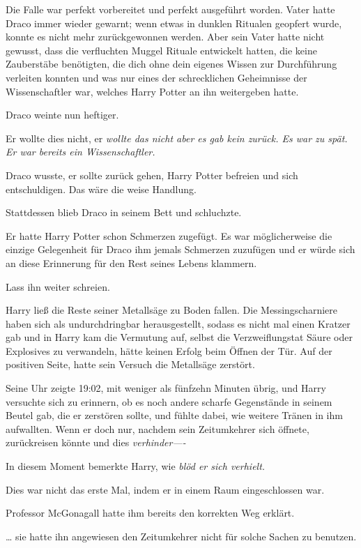 {Die Falle war perfekt vorbereitet und perfekt ausgeführt worden. Vater hatte Draco immer wieder gewarnt; wenn etwas in dunklen Ritualen geopfert wurde, konnte es nicht mehr zurückgewonnen werden. Aber sein Vater hatte nicht gewusst, dass die verfluchten Muggel Rituale entwickelt hatten, die keine Zauberstäbe benötigten, die dich ohne dein eigenes Wissen zur Durchführung verleiten konnten und was nur eines der schrecklichen Geheimnisse der Wissenschaftler war, welches Harry Potter an ihn weitergeben hatte.

Draco weinte nun heftiger.

Er wollte dies nicht, er \emph{wollte das nicht aber es gab kein zurück. Es war zu spät. Er war bereits ein Wissenschaftler.}

Draco wusste, er sollte zurück gehen, Harry Potter befreien und sich entschuldigen. Das wäre die weise Handlung.

Stattdessen blieb Draco in seinem Bett und schluchzte.

Er hatte Harry Potter schon Schmerzen zugefügt. Es war möglicherweise die einzige Gelegenheit für Draco ihm jemals Schmerzen zuzufügen und er würde sich an diese Erinnerung für den Rest seines Lebens klammern.

Lass ihn weiter schreien.

Harry ließ die Reste seiner Metallsäge zu Boden fallen. Die Messingscharniere haben sich als undurchdringbar herausgestellt, sodass es nicht mal einen Kratzer gab und in Harry kam die Vermutung auf, selbst die Verzweiflungstat Säure oder Explosives zu verwandeln, hätte keinen Erfolg beim Öffnen der Tür. Auf der positiven Seite, hatte sein Versuch die Metallsäge zerstört.

Seine Uhr zeigte 19:02, mit weniger als fünfzehn Minuten übrig, und Harry versuchte sich zu erinnern, ob es noch andere scharfe Gegenstände in seinem Beutel gab, die er zerstören sollte, und fühlte dabei, wie weitere Tränen in ihm aufwallten. Wenn er doch nur, nachdem sein Zeitumkehrer sich öffnete, zurückreisen könnte und dies \emph{verhinder----}

In diesem Moment bemerkte Harry, wie \emph{blöd er sich verhielt.}

Dies war nicht das erste Mal, indem er in einem Raum eingeschlossen war.

Professor McGonagall hatte ihm bereits den korrekten Weg erklärt.

… sie hatte ihn angewiesen den Zeitumkehrer nicht für solche Sachen zu benutzen.

}
